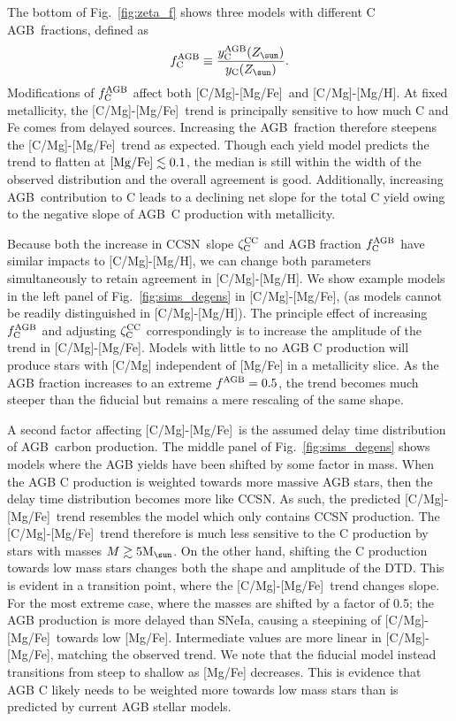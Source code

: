 \documentclass[fleqn,
usenatbib]{mnras}
\newcommand{\agb}{AGB}
\newcommand{\cc}{CCSN}
\newcommand{\caah}{[C/Mg]-[Mg/H]}
\newcommand{\caafe}{[C/Mg]-[Mg/Fe]}
\newcommand{\Yct}{{y_{\rm C}}}
\newcommand{\Ycagb}{{y_{\rm C}^{\rm AGB}}}
\newcommand{\zcc}{\zeta_{\rm C}^{\rm CC}}
\newcommand{\fagb}{f_{\rm C}^{\rm AGB}}
\newcommand{\Mo}{ {\rm M}_{\sun}}
\newcommand{\Zo}{ Z_{\sun}}
\begin{document}
The bottom of Fig.~\ref{fig:zeta_f} shows three models with different C \agb\  fractions, defined as 
\begin{equation}\label{eq:f_agb}
    \fagb \equiv \frac{\Ycagb(\Zo)}{\Yct(\Zo)}.
\end{equation}
Modifications of $\fagb$ affect both \caafe\ and \caah. At fixed metallicity, the \caafe\ trend is principally sensitive to how much C and Fe comes from delayed sources. Increasing the \agb\ fraction therefore steepens the \caafe\ trend as expected. Though each yield model predicts the trend to flatten at ${\rm [Mg/Fe]} \lesssim 0.1 $, the median is still within the width of the observed distribution and the overall agreement is good. Additionally, increasing \agb\ contribution to C leads to a declining net slope for the total C yield owing to the negative slope of \agb\ C production with metallicity.

Because both the increase in \cc\ slope $\zcc$ and AGB fraction $\fagb$ have similar impacts to \caah, we can change both parameters simultaneously to retain agreement in \caah. We show example models in the left panel of Fig.~\ref{fig:sims_degens} in \caafe, (as models cannot be readily distinguished in \caah). The principle effect of increasing $\fagb$ and adjusting $\zcc$ correspondingly is to increase the amplitude of the trend in \caafe. Models with little to no AGB C production will produce stars with [C/Mg] independent of [Mg/Fe] in a metallicity slice. As the AGB fraction increases to an extreme $f^{\rm AGB}=0.5$, the trend becomes much steeper than the fiducial but remains a mere rescaling of the same shape. 


A second factor affecting \caafe\ is the assumed delay time distribution of \agb\ carbon production.
The middle panel of Fig.~\ref{fig:sims_degens} shows models where the AGB yields have been shifted by some factor in mass. When the AGB C production is weighted towards more massive AGB stars, then the delay time distribution becomes more like CCSN. As such, the predicted \caafe\ trend resembles the model which only contains CCSN production. The \caafe\ trend therefore is much less sensitive to the C production by stars with masses $M \gtrsim 5 \Mo$. On the other hand, shifting the C production towards low mass stars changes both the shape and amplitude of the DTD. This is evident in a transition point, where the \caafe\ trend changes slope. For the most extreme case, where the masses are shifted by a factor of 0.5; the AGB production is more delayed than SNeIa, causing a steepining of \caafe\ towards low [Mg/Fe]. Intermediate values are more linear in \caafe, matching the observed trend. We note that the fiducial model instead transitions from steep to shallow as [Mg/Fe] decreases. This is evidence that AGB C likely needs to be weighted more towards low mass stars than is predicted by current AGB stellar models.
\end{document}
